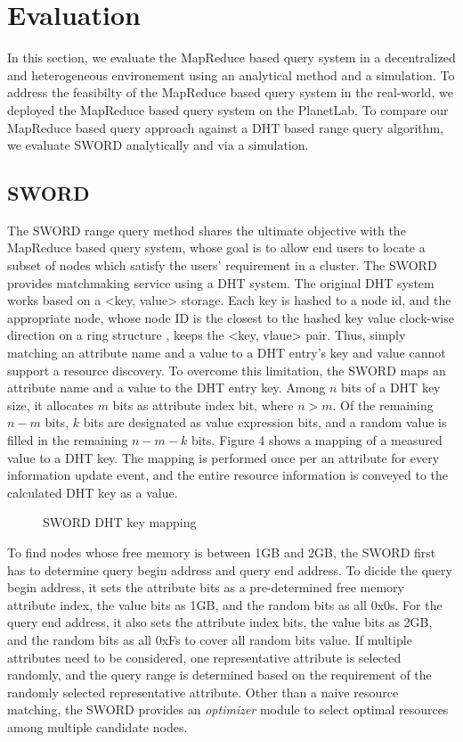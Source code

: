 \documentclass{acm_proc_article-sp}
\begin{document}
\section{Evaluation}
In this section, we evaluate the MapReduce based query system in a decentralized and heterogeneous environement using an analytical method and a simulation. 
To address the feasibilty of the MapReduce based query system in the real-world, we deployed the MapReduce based query system on the PlanetLab. 
To compare our MapReduce based query approach against a DHT based range query algorithm, we evaluate SWORD\cite{sword} analytically and via a simulation.
\subsection{SWORD}
The SWORD range query method shares the ultimate objective with the MapReduce based query system, whose goal is to allow end users to locate a subset of nodes which satisfy the users' requirement in a cluster.
The SWORD provides matchmaking service using a DHT system. The original DHT system works based on a <key, value> storage. 
Each key is hashed to a node id, and the appropriate node, whose node ID is the closest to the hashed key value clock-wise direction on a ring structure\cite{chord} \cite{pastry}, keeps the <key, vlaue> pair. 
Thus, simply matching an attribute name and a value to a DHT entry's key and value cannot support a resource discovery. 
To overcome this limitation, the SWORD maps an attribute name and a value to the DHT entry key. Among $n$ bits of a DHT key size, it allocates $m$ bits as attribute index bit, where $n>m$. 
Of the remaining $n-m$ bits, $k$ bits are designated as value expression bits, and a random value is filled in the remaining $n-m-k$ bits. Figure 4 shows a mapping of a measured value to a DHT key.
The mapping is performed once per an attribute for every information update event, and the entire resource information is conveyed to the calculated DHT key as a value.
\begin{figure}
\centering
{}
\caption{SWORD DHT key mapping}
\end{figure}
To find nodes whose free memory is between 1GB and 2GB, the SWORD first has to determine query begin address and query end address. 
To dicide the query begin address, it sets the attribute bits as a pre-determined free memory attribute index, the value bits as 1GB, and the random bits as all 0x0s.
For the query end address, it also sets the attribute index bits, the value bits as 2GB, and the random bits as all 0xFs to cover all random bits value. 
If multiple attributes need to be considered, one representative attribute is selected randomly, and the query range is determined based on the requirement of the randomly selected representative attribute.
Other than a naive resource matching, the SWORD provides an \textit{optimizer} module to select optimal resources among multiple candidate nodes. 
\end{document}
